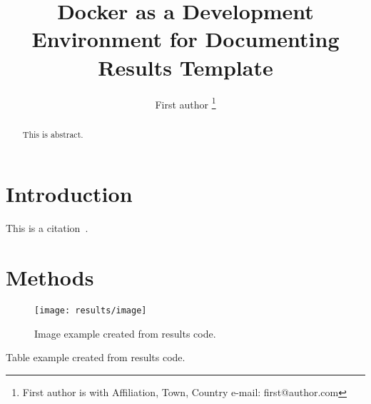 \documentclass{article}
\begin{document}

\title{Docker as a Development Environment for Documenting Results Template}

\author{First author
\thanks{First author is with Affiliation, Town, Country e-mail: first@author.com}}

\maketitle

\begin{abstract}
	This is abstract.
\end{abstract}

\section{Introduction}
This is a citation~\cite{author2000title}.

\section{Methods}

\begin{figure}
	\texttt{[image: results/image]}
	\caption{Image example created from results code.}
	\label{fig:image}
\end{figure}

\begin{table}
	\centering
	\caption{Table example created from results code.}
	\label{table:table}
	\setlength\tabcolsep{4.2pt}
	
\end{table}



\end{document}
